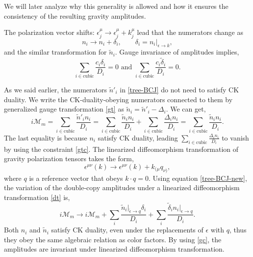 \documentclass[a4paper,11pt]{article}
\begin{document}
We will later analyze why this generality is allowed and how it ensures the consistency of the resulting gravity amplitudes.\par 
The polarization vector shifts: $\epsilon_j^{\mu}\to \epsilon_j^{\mu}+k_j^{\mu}$ lead that the numerators change as
\begin{equation}
    n_i\to n_i+\delta_i,\qquad \delta_i=n_i|_{\epsilon\to k},
\end{equation} 
and the similar transformation for $\tilde{n}_i$. Gauge invariance of amplitudes implies,
\begin{equation}\label{gc}
    \sum_{i\in \text{cubic}}\frac{c_i \delta_i}{D_i}=0\text{  and  } \sum_{i\in \text{cubic}}\frac{c_i \tilde{\delta}_i}{D_i}=0.
\end{equation}\par
As we said earlier, the numerators $\tilde{n}'_i$  in \eqref{tree-BCJ} do not need to satisfy CK duality. We write 
the CK-duality-obeying numerators connected to them by generalized gauge transformation \eqref{gt} as $\tilde{n}_i=\tilde{n}'_i-\Delta_i$. We can get,
\begin{equation}\label{tree-BCJ-new}
    i \mathcal{M}_m=\sum_{i\in \text{cubic}}\frac{\tilde{n}'_i n_i}{D_i}=\sum_{i\in \text{cubic}}\frac{\tilde{n}_i n_i}{D_i}+\sum_{i\in \text{cubic}}\frac{\Delta_i n_i}{D_i}=\sum_{i\in \text{cubic}}\frac{\tilde{n}_i n_i}{D_i}.
\end{equation}
The last equality is because $n_i$ satisfy CK duality, leading $\sum_{i\in \text{cubic}}\frac{\Delta_i n_i}{D_i}$ to vanish by using the constraint \eqref{gtc}.
The linearized diffeomorphism transformation of gravity polarization tensors takes the form,
\begin{equation}\label{dt}
    \epsilon^{\mu \nu}(k)\to \epsilon^{\mu \nu}(k)+k_{(\mu}q_{\nu)},
\end{equation}
where $q$ is a reference vector that obeys $k\cdot q=0$. Using equation \eqref{tree-BCJ-new}, 
the variation of the double-copy amplitudes under a linearized diffeomorphism transformation \eqref{dt} is,
\begin{equation}
    i \mathcal{M}_m\to i \mathcal{M}_m+\sum_i \frac{\tilde{n}_i|_{\tilde{\epsilon}\to q} \delta_i}{D_i}+\sum_i \frac{\tilde{\delta}_i n_i|_{\epsilon\to q}}{D_i}.
\end{equation}
Both $n_i$ and $\tilde{n}_i$ satisfy CK duality, even under the replacements of $\epsilon$ with $q$, thus they obey the same algebraic relation as color factors. 
By using \eqref{gc}, the amplitudes are invariant under linearized diffeomorphism transformation.
\end{document}
